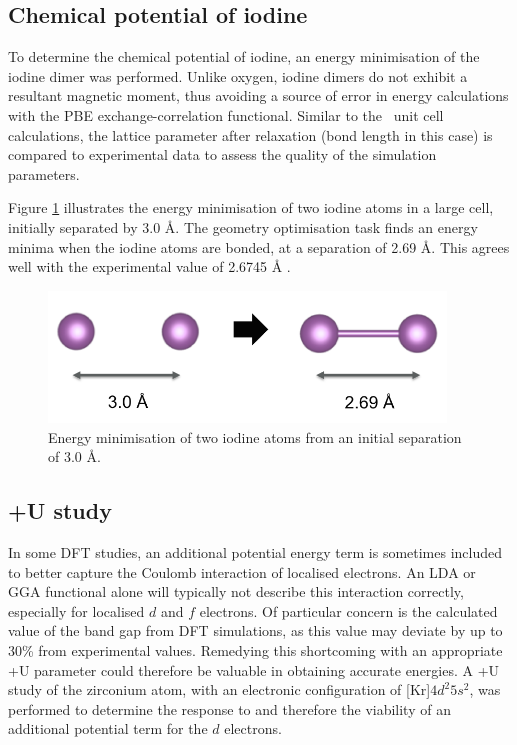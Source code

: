 \subsection{Chemical potential of iodine}

To determine the chemical potential of iodine, an energy minimisation of the iodine dimer was performed. Unlike oxygen, iodine dimers do not exhibit a resultant magnetic moment, thus avoiding a source of error in energy calculations with the PBE exchange-correlation functional. Similar to the \zirconia\ unit cell calculations, the lattice parameter after relaxation (bond length in this case) is compared to experimental data to assess the quality of the simulation parameters.

Figure \ref{figure:iodine_dimer} illustrates the energy minimisation of two iodine atoms in a large cell, initially separated by 3.0 \r{A}. The geometry optimisation task finds an energy minima when the iodine atoms are bonded, at a separation of 2.69 \r{A}. This agrees well with the experimental value of 2.6745 \r{A} \cite{ukaji1966effect}.

\begin{figure}[h] %
\centering
\includegraphics[height=3.5cm]{images/iodine_geom.png}
\caption{Energy minimisation of two iodine atoms from an initial separation of 3.0 \r{A}.}
\label{figure:iodine_dimer}
\end{figure}

\subsection{+U study}

In some DFT studies, an additional potential energy term is sometimes included to better capture the Coulomb interaction of localised electrons. An LDA or GGA functional alone will typically not describe this interaction correctly, especially for localised $d$ and $f$ electrons. Of particular concern is the calculated value of the band gap from DFT simulations, as this value may deviate by up to 30\% from experimental values. Remedying this shortcoming with an appropriate +U parameter could therefore be valuable in obtaining accurate energies. A +U study of the zirconium atom, with an electronic configuration of [Kr]$4d^{2}5s^{2}$, was performed to determine the response to and therefore the viability of an additional potential term for the $d$ electrons.

